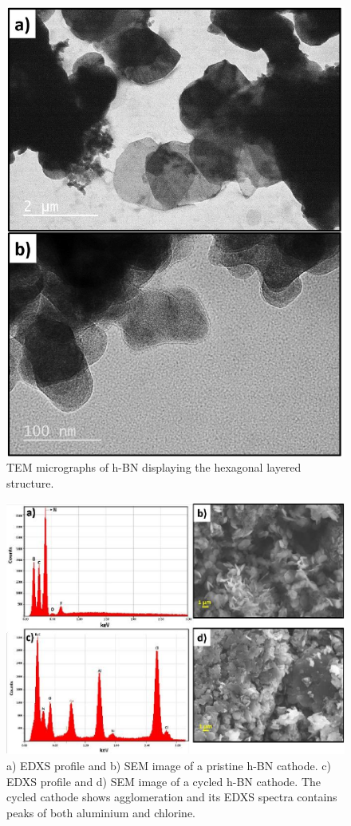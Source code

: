 \begin{figure}[tbh!]
\centering
\includegraphics[width=\textwidth]{Figures/appendix/hbntem.pdf}
\caption{TEM micrographs of h-BN displaying the hexagonal layered structure.}
\label{Figures/appendix:hbntem}
\end{figure}
\begin{figure}[tbh!]
\centering
\includegraphics[width=\textwidth]{Figures/appendix/hbnedxsem.pdf}
\caption{a) EDXS profile and b) SEM image of a pristine h-BN cathode. c) EDXS profile and d) SEM image of a cycled h-BN cathode. The cycled cathode shows agglomeration and its EDXS spectra contains peaks of both aluminium and chlorine.}
\label{Figures/appendix:hbnedxsem}
\end{figure}
